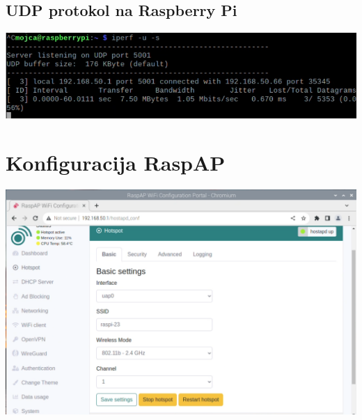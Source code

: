 \documentclass[11pt,a4paper,slovene]{article}
\begin{document}
\subsection{UDP protokol na Raspberry Pi}
\includegraphics[width=\textwidth]{2_dn_udp_g_rpi}

\section{Konfiguracija RaspAP}
\includegraphics[width=\textwidth]{2_dn_raspapconf}


\pagebreak
\end{document}
